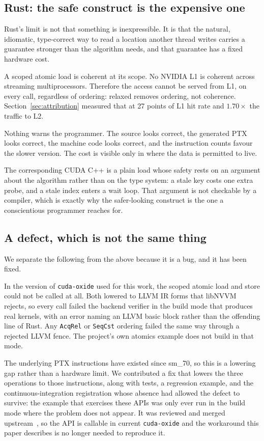 \documentclass[11pt]{article}
\begin{document}
\subsection{Rust: the safe construct is the expensive one}

Rust's limit is not that something is inexpressible. It is that the natural,
idiomatic, type-correct way to read a location another thread writes carries a
guarantee stronger than the algorithm needs, and that guarantee has a fixed
hardware cost.

A scoped atomic load is coherent at its scope. No NVIDIA L1 is coherent across
streaming multiprocessors. Therefore the access cannot be served from L1, on
every call, regardless of ordering: relaxed removes ordering, not coherence.
Section~\ref{sec:attribution} measured that at 27 points of L1 hit rate and
$1.70\times$ the traffic to L2.

Nothing warns the programmer. The source looks correct, the generated PTX looks
correct, the machine code looks correct, and the instruction counts favour the
slower version. The cost is visible only in where the data is permitted to live.

The corresponding CUDA C++ is a plain load whose safety rests on an argument
about the algorithm rather than on the type system: a stale key costs one extra
probe, and a stale index enters a wait loop. That argument is not checkable by a
compiler, which is exactly why the safer-looking construct is the one a
conscientious programmer reaches for.

\subsection{A defect, which is not the same thing}

We separate the following from the above because it is a bug, and it has been
fixed.

In the version of \texttt{cuda-oxide} used for this work, the scoped atomic load
and store could not be called at all. Both lowered to LLVM IR forms that libNVVM
rejects, so every call failed the backend verifier in the build mode that
produces real kernels, with an error naming an LLVM basic block rather than the
offending line of Rust. Any \texttt{AcqRel} or \texttt{SeqCst} ordering failed
the same way through a rejected LLVM fence. The project's own atomics example
does not build in that mode.

The underlying PTX instructions have existed since sm\_70, so this is a lowering
gap rather than a hardware limit. We contributed a fix that lowers the three
operations to those instructions, along with tests, a regression example, and the
continuous-integration registration whose absence had allowed the defect to
survive: the example that exercises these APIs was only ever run in the build
mode where the problem does not appear. It was reviewed and merged
upstream~\cite{cudaoxidepr}, so the API is callable in current
\texttt{cuda-oxide} and the workaround this paper describes is no longer needed
to reproduce it.
\end{document}
